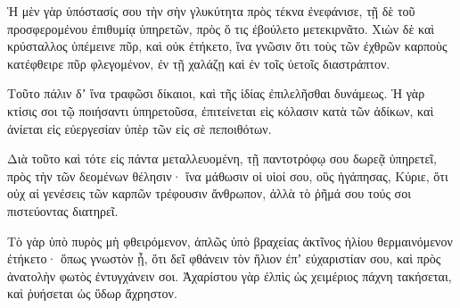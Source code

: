 {Ἡ μὲν γὰρ ὑπόστασίς σου τὴν σὴν γλυκύτητα πρὸς τέκνα ἐνεφάνισε, τῇ δὲ τοῦ προσφερομένου ἐπιθυμίᾳ ὑπηρετῶν, πρὸς ὅ τις ἐβούλετο μετεκιρνᾶτο.
Χιὼν δὲ καὶ κρύσταλλος ὑπέμεινε πῦρ, καὶ οὐκ ἐτήκετο, ἵνα γνῶσιν ὅτι τοὺς τῶν ἐχθρῶν καρποὺς κατέφθειρε πῦρ φλεγομένον, ἐν τῇ χαλάζῃ καὶ ἐν τοῖς ὑετοῖς διαστράπτον.
\par }{\PP {}Τοῦτο πάλιν δʼ ἵνα τραφῶσι δίκαιοι, καὶ τῆς ἰδίας ἐπιλελῆσθαι δυνάμεως.
Ἡ γὰρ κτίσις σοι τῷ ποιήσαντι ὑπηρετοῦσα, ἐπιτείνεται εἰς κόλασιν κατὰ τῶν ἀδίκων, καὶ ἀνίεται εἰς εὐεργεσίαν ὑπὲρ τῶν εἰς σὲ πεποιθότων.
\par }{\PP {}Διὰ τοῦτο καὶ τότε εἰς πάντα μεταλλευομένη, τῇ παντοτρόφῳ σου δωρεᾷ ὑπηρετεῖ, πρὸς τὴν τῶν δεομένων θέλησιν·
ἵνα μάθωσιν οἱ υἱοί σου, οὓς ἠγάπησας, Κύριε, ὅτι οὐχ αἱ γενέσεις τῶν καρπῶν τρέφουσιν ἄνθρωπον, ἀλλὰ τὸ ῥῆμά σου τούς σοι πιστεύοντας διατηρεῖ.
\par }{\PP {}Τὸ γὰρ ὑπὸ πυρὸς μὴ φθειρόμενον, ἁπλῶς ὑπὸ βραχείας ἀκτῖνος ἡλίου θερμαινόμενον ἐτήκετο·
ὅπως γνωστὸν ᾖ, ὅτι δεῖ φθάνειν τὸν ἥλιον ἐπʼ εὐχαριστίαν σου, καὶ πρὸς ἀνατολὴν φωτὸς ἐντυγχάνειν σοι.
Ἀχαρίστου γὰρ ἐλπὶς ὡς χειμέριος πάχνη τακήσεται, καὶ ῥυήσεται ὡς ὕδωρ ἄχρηστον.

}
